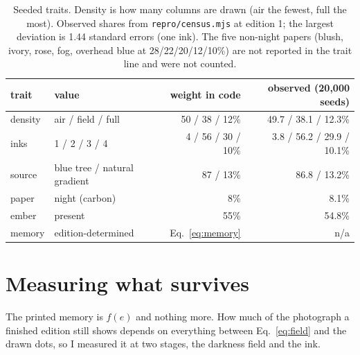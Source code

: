 \documentclass[11pt]{article}
\begin{document}
\begin{table}[t]
  \centering
  \small
  \begin{tabular}{llrr}
    \toprule
    trait & value & weight in code & observed (20{,}000 seeds) \\
    \midrule
    density & air / field / full & 50 / 38 / 12\% & 49.7 / 38.1 / 12.3\% \\
    inks & 1 / 2 / 3 / 4 & 4 / 56 / 30 / 10\% & 3.8 / 56.2 / 29.9 / 10.1\% \\
    source & blue tree / natural gradient & 87 / 13\% & 86.8 / 13.2\% \\
    paper & night (carbon) & 8\% & 8.1\% \\
    ember & present & 55\% & 54.8\% \\
    memory & edition-determined & Eq.~\eqref{eq:memory} & n/a \\
    \bottomrule
  \end{tabular}
  \caption{Seeded traits. Density is how many columns are drawn (air the fewest, full the most). Observed shares from \texttt{repro/census.mjs} at edition 1; the largest deviation is 1.44 standard errors (one ink). The five non-night papers (blush, ivory, rose, fog, overhead blue at 28/22/20/12/10\%) are not reported in the trait line and were not counted.}
  \label{tab:traits}
\end{table}

\section{Measuring what survives}
\label{sec:method}

The printed memory is $f(e)$ and nothing more. How much of the photograph a finished edition still shows depends on everything between Eq.~\eqref{eq:field} and the drawn dots, so I measured it at two stages, the darkness field and the ink.
\end{document}
